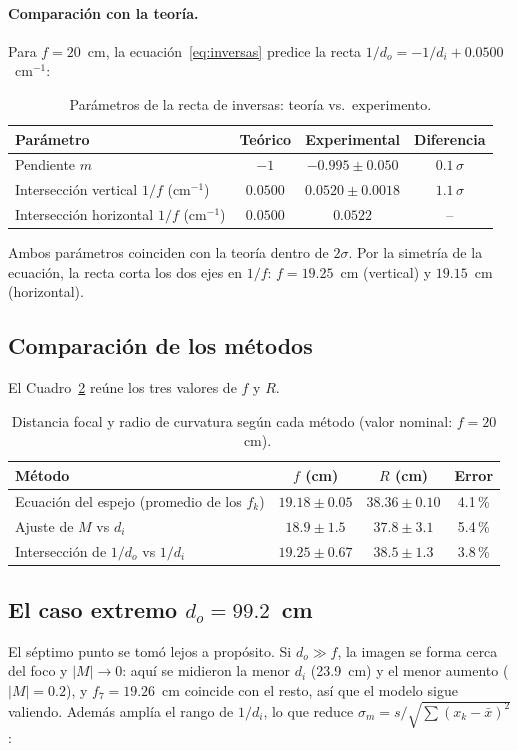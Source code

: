 \documentclass[11pt,a4paper]{article}
\begin{document}
\paragraph{Comparación con la teoría.} Para $f = 20$~cm, la ecuación~\eqref{eq:inversas} predice la recta $1/d_o = -1/d_i + 0.0500$~cm$^{-1}$:
\begin{table}[H]
\centering
\begin{tabular}{lccc}
\toprule
\textbf{Parámetro} & \textbf{Teórico} & \textbf{Experimental} & \textbf{Diferencia} \\
\midrule
Pendiente $m$ & $-1$ & $-0.995 \pm 0.050$ & $0.1\,\sigma$ \\
Intersección vertical $1/f$ (cm$^{-1}$) & $0.0500$ & $0.0520 \pm 0.0018$ & $1.1\,\sigma$ \\
Intersección horizontal $1/f$ (cm$^{-1}$) & $0.0500$ & $0.0522$ & -- \\
\bottomrule
\end{tabular}
\caption{Parámetros de la recta de inversas: teoría vs.\ experimento.}
\label{tab:inversas_teoria}
\end{table}
\noindent Ambos parámetros coinciden con la teoría dentro de $2\sigma$. Por la simetría de la ecuación, la recta corta los dos ejes en $1/f$: $f = 19.25$~cm (vertical) y $19.15$~cm (horizontal).

\subsection{Comparación de los métodos}
El Cuadro~\ref{tab:metodos} reúne los tres valores de $f$ y $R$.

\begin{table}[H]
\centering
\begin{tabular}{lccc}
\toprule
\textbf{Método} & $f$ (cm) & $R$ (cm) & \textbf{Error} \\
\midrule
Ecuación del espejo (promedio de los $f_k$) & $19.18 \pm 0.05$ & $38.36 \pm 0.10$ & 4.1\,\% \\
Ajuste de $M$ vs $d_i$ & $18.9 \pm 1.5$ & $37.8 \pm 3.1$ & 5.4\,\% \\
Intersección de $1/d_o$ vs $1/d_i$ & $19.25 \pm 0.67$ & $38.5 \pm 1.3$ & 3.8\,\% \\
\bottomrule
\end{tabular}
\caption{Distancia focal y radio de curvatura según cada método (valor nominal: $f = 20$~cm).}
\label{tab:metodos}
\end{table}

\subsection{El caso extremo $d_o = 99.2$~cm}
\label{sec:extremo}
El séptimo punto se tomó lejos a propósito. Si $d_o \gg f$, la imagen se forma cerca del foco y $|M| \to 0$: aquí se midieron la menor $d_i$ (23.9~cm) y el menor aumento ($|M| = 0.2$), y $f_7 = 19.26$~cm coincide con el resto, así que el modelo sigue valiendo. Además amplía el rango de $1/d_i$, lo que reduce $\sigma_m = s/\sqrt{\sum (x_k - \bar x)^2}$:
\end{document}
